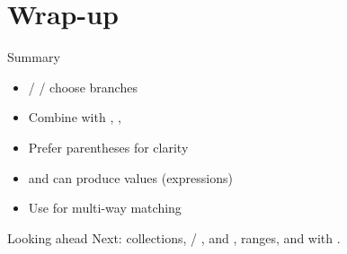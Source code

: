 \documentclass[aspectratio=169,11pt]{beamer}
\begin{document}
    \section{Wrap-up}

    \begin{frame}{Summary}
        \begin{itemize}
            \item {} /  /  choose branches
            \item Combine with \kotlincode{\&\&}, \kotlincode{||}, \kotlincode{!}
            \item Prefer parentheses for clarity
            \item {} and  can produce values (expressions)
            \item Use  for multi-way matching
        \end{itemize}
    \end{frame}

    \begin{frame}{Looking ahead}
        Next: collections,  / ,  and
        , ranges, and  with .
    \end{frame}
\end{document}
